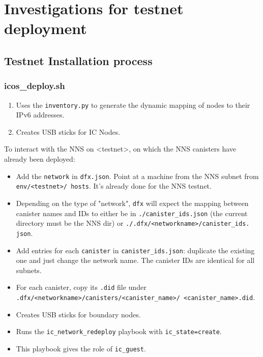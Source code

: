 \chapter{Investigations for testnet deployment}
\label{chap:chapterfive}

\section{Testnet Installation process}

\subsection{icos\_deploy.sh}

\begin{enumerate}
    \item Uses the \texttt{inventory.py} to generate the dynamic mapping of nodes to their IPv6 addresses.
    \item Creates USB sticks for IC Nodes.
\end{enumerate}

To interact with the NNS on <testnet>, on which the NNS canisters have already been deployed:
\begin{itemize}
    \item Add the \texttt{network} in \texttt{dfx.json}. Point at a machine from the NNS subnet from \texttt{env/<testnet>/
    hosts}. It's already done for the NNS testnet.
    \item Depending on the type of "network", \texttt{dfx} will expect the mapping between canister names and IDs to either be 
    in \texttt{./canister\_ids.json} (the current directory must be the NNS dir) or \texttt{./.dfx/<networkname>/canister\_ids.
    json}.
    \item Add entries for each \texttt{canister} in \texttt{canister\_ids.json}: duplicate the existing one and just change the 
    network name. The canister IDs are identical for all subnets.
    \item For each canister, copy its \texttt{.did} file under 
    \texttt{.dfx/<networkname>/canisters/<canister\_name>/  <canister\_name>.did}.
    \item Creates USB sticks for boundary nodes.
    \item Runs the \texttt{ic\_network\_redeploy} playbook with \texttt{ic\_state=create}.
    \item This playbook gives the role of \texttt{ic\_guest}.
\end{itemize}

